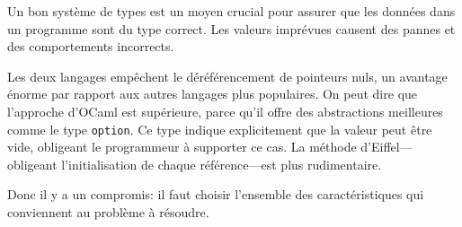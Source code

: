 \documentclass[french]{report}
\begin{document}
Un bon système de types est un moyen crucial pour assurer que les données dans un programme sont du type correct. Les valeurs imprévues causent des pannes et des comportements incorrects.

Les deux langages empêchent le déréférencement de pointeurs nuls, un avantage énorme par rapport aux autres langages plus populaires. On peut dire que l'approche d'OCaml est supérieure, parce qu'il offre des abstractions meilleures comme le type \texttt{option}. Ce type indique explicitement que la valeur peut être vide, obligeant le programmeur à supporter ce cas. La méthode d'Eiffel---obligeant l'initialisation de chaque référence---est plus rudimentaire.



Donc il y a un compromis: il faut choisir l'ensemble des caractéristiques qui conviennent au problème à résoudre.
\end{document}
